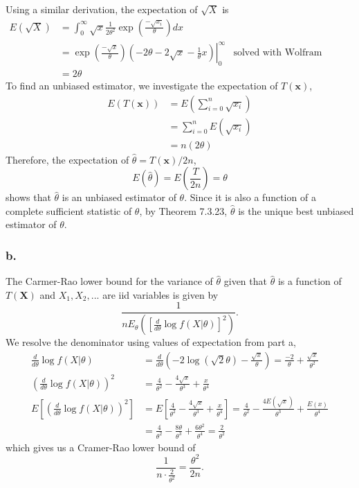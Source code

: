 \documentclass{article}
\begin{document}
Using a similar derivation, the expectation of $\sqrt{X}$ is
\begin{align*}
E(\sqrt{X}) &= \int_0^\infty \sqrt{x}\frac{1}{2\theta^2}\exp{\left(\frac{-\sqrt{x_i}}{\theta}\right)} dx \\
&=\left.\exp{\left(\frac{-\sqrt{x}}{\theta}\right)}\left(-2\theta-2\sqrt{x}-\frac{1}{\theta}x\right)\right|_0^\infty &\text{solved with Wolfram Alpha} \\
&=2\theta
\end{align*}
To find an unbiased estimator, we investigate the expectation of $T(\mathbf{x})$,
\begin{align*}
E\left(T(\mathbf{x})\right) &= E\left(\sum_{i=0}^n\sqrt{x_i}\right) \\
&=\sum_{i=0}^n E\left(\sqrt{x_i}\right) \\
&=n(2\theta)
\end{align*}
Therefore, the expectation of $\hat{\theta} = T(\mathbf{x})/2n$, \[E(\hat{\theta}) = E\left(\frac{T}{2n}\right) = \theta\] shows that $\hat{\theta}$ is an unbiased estimator of $\theta$. Since it is also a function of a complete sufficient statistic of $\theta$, by Theorem 7.3.23, $\hat{\theta}$ is the unique best unbiased estimator of $\theta$.

\subsubsection*{b.}
The Carmer-Rao lower bound for the variance of $\hat{\theta}$ given that $\hat{\theta}$ is a function of $T(\mathbf{X})$ and $X_1, X_2, ...$ are iid variables is given by 
\[\frac{1}{nE_\theta\left(\left[\frac{d}{d\theta}\log f(X|\theta)\right]^2\right)}.\]
We resolve the denominator using values of expectation from part a, 
\begin{align*}
\frac{d}{d\theta}\log f(X|\theta) &= \frac{d}{d\theta}\left(-2\log(\sqrt{2}\theta)-\frac{\sqrt{x}}{\theta}\right) = \frac{-2}{\theta}+\frac{\sqrt{x}}{\theta^2} \\
\left(\frac{d}{d\theta}\log f(X|\theta)\right)^2 &= \frac{4}{\theta^2}-\frac{4\sqrt{x}}{\theta^3}+\frac{x}{\theta^4} \\
E\left[\left(\frac{d}{d\theta}\log f(X|\theta)\right)^2\right] &= E\left[\frac{4}{\theta^2}-\frac{4\sqrt{x}}{\theta^3}+\frac{x}{\theta^4}\right] = \frac{4}{\theta^2}-\frac{4E(\sqrt{x})}{\theta^3}+\frac{E(x)}{\theta^4} \\
&=\frac{4}{\theta^2} - \frac{8\theta}{\theta^3}+\frac{6\theta^2}{\theta^4} = \frac{2}{\theta^2}
\end{align*}
which gives us a Cramer-Rao lower bound of 
\[\frac{1}{n\cdot\frac{2}{\theta^2}} = \frac{\theta^2}{2n}.\]
\end{document}
